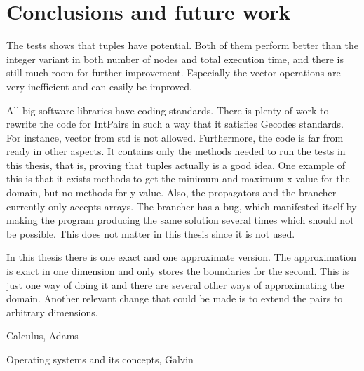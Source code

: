 \documentclass[a4paper,11pt]{article}
\begin{document}
\section{Conclusions and future work}
The tests shows that tuples have potential. Both of them perform better than the integer variant in both number of nodes and total execution time, and there is still much room for further improvement. Especially the vector operations are very inefficient and can easily be improved.

All big software libraries have coding standards. There is plenty of work to rewrite the code for IntPairs in such a way that it satisfies Gecodes standards. For instance, vector from std is not allowed. Furthermore, the code is far from ready in other aspects. It contains only the methods needed to run the tests in this thesis, that is, proving that tuples actually is a good idea. One example of this is that it exists methods to get the minimum and maximum x-value for the domain, but no methods for y-value. Also, the propagators and the brancher currently only accepts arrays. The brancher has a bug, which manifested itself by making the program producing the same solution several times which should not be possible. This does not matter in this thesis since it is not used.

In this thesis there is one exact and one approximate version. The approximation is exact in one dimension and only stores the boundaries for the second. This is just one way of doing it and there are several other ways of approximating the domain. Another relevant change that could be made is to extend the pairs to arbitrary dimensions.


\begin{thebibliography}{99}
	Calculus, 
	Adams
	
	Operating systems and its concepts,
	Galvin
\end{thebibliography}
\end{document}
